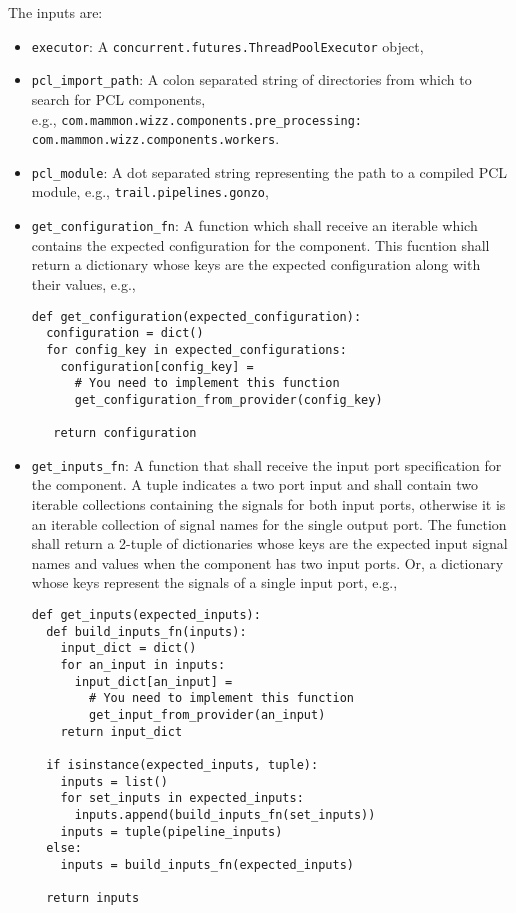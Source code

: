 The inputs are:
\begin{itemize}
\item \texttt{executor}: A \texttt{concurrent.futures.ThreadPoolExecutor} object,
\item \texttt{pcl\_import\_path}: A colon separated string of directories from which to search for PCL components,\\e.g., \texttt{com.mammon.wizz.components.pre\_processing:\\com.mammon.wizz.components.workers}.
\item \texttt{pcl\_module}: A dot separated string representing the path to a compiled PCL module, e.g., \texttt{trail.pipelines.gonzo},
\item \texttt{get\_configuration\_fn}: A function which shall receive an iterable which contains the expected configuration for the component. This fucntion shall return a dictionary whose keys are the expected configuration along with their values, e.g.,
\begin{verbatim}
def get_configuration(expected_configuration):
  configuration = dict()
  for config_key in expected_configurations:
    configuration[config_key] =
      # You need to implement this function
      get_configuration_from_provider(config_key)

   return configuration
\end{verbatim}
\item \texttt{get\_inputs\_fn}: A function that shall receive the input port specification for the component. A tuple indicates a two port input and shall contain two iterable collections containing the signals for both input ports, otherwise it is an iterable collection of signal names for the single output port. The function shall return a 2-tuple of dictionaries whose keys are the expected input signal names and values when the component has two input ports. Or, a dictionary whose keys represent the signals of a single input port, e.g.,
\begin{verbatim}
def get_inputs(expected_inputs):
  def build_inputs_fn(inputs):
    input_dict = dict()
    for an_input in inputs:
      input_dict[an_input] =
        # You need to implement this function
        get_input_from_provider(an_input)
    return input_dict

  if isinstance(expected_inputs, tuple):
    inputs = list()
    for set_inputs in expected_inputs:
      inputs.append(build_inputs_fn(set_inputs))
    inputs = tuple(pipeline_inputs)
  else:
    inputs = build_inputs_fn(expected_inputs)

  return inputs
\end{verbatim}
\end{itemize}